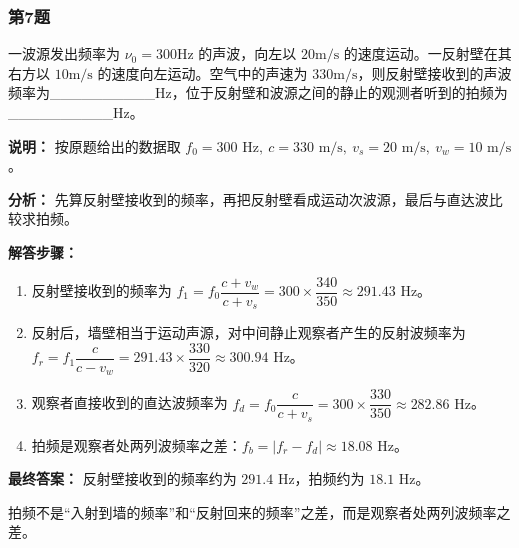 \documentclass[12pt,a4paper]{ctexart}
\begin{document}
\subsubsection*{第7题}
\begin{tcolorbox}[colback=gray!2!white,colframe=black!60,title={题目}]
一波源发出频率为 \(\nu_0=300\mathrm{Hz}\) 的声波，向左以 \(20\mathrm{m/s}\) 的速度运动。一反射壁在其右方以 \(10\mathrm{m/s}\) 的速度向左运动。空气中的声速为 \(330\mathrm{m/s}\)，则反射壁接收到的声波频率为\_\_\_\_\_\_\_\_\_\_Hz，位于反射壁和波源之间的静止的观测者听到的拍频为\_\_\_\_\_\_\_\_\_\_Hz。\par
\textbf{说明：}
按原题给出的数据取 \(f_0=300\text{ Hz},\ c=330\text{ m/s},\ v_s=20\text{ m/s},\ v_w=10\text{ m/s}\)。\par
\end{tcolorbox}
\begin{tcolorbox}[colback=blue!2!white,colframe=blue!55!black,title={完整答案}]
\textbf{分析：}
先算反射壁接收到的频率，再把反射壁看成运动次波源，最后与直达波比较求拍频。\par
\textbf{解答步骤：}
\begin{enumerate}
\item 反射壁接收到的频率为 \(f_1=f_0\dfrac{c+v_w}{c+v_s}=300\times \dfrac{340}{350}\approx 291.43\text{ Hz}\)。
\item 反射后，墙壁相当于运动声源，对中间静止观察者产生的反射波频率为 \(f_r=f_1\dfrac{c}{c-v_w}=291.43\times \dfrac{330}{320}\approx 300.94\text{ Hz}\)。
\item 观察者直接收到的直达波频率为 \(f_d=f_0\dfrac{c}{c+v_s}=300\times \dfrac{330}{350}\approx 282.86\text{ Hz}\)。
\item 拍频是观察者处两列波频率之差：\(f_b=|f_r-f_d|\approx 18.08\text{ Hz}\)。
\end{enumerate}
\textbf{最终答案：}
反射壁接收到的频率约为 \(291.4\text{ Hz}\)，拍频约为 \(18.1\text{ Hz}\)。\par
\end{tcolorbox}
\begin{tcolorbox}[colback=red!2!white,colframe=red!55!black,title={易错点}]
拍频不是“入射到墙的频率”和“反射回来的频率”之差，而是观察者处两列波频率之差。\par
\end{tcolorbox}
\end{document}
